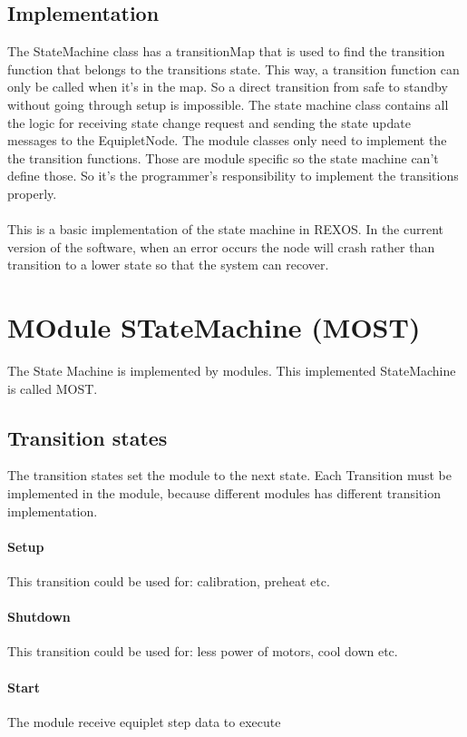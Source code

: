 \documentclass[12pt,a4paper]{report}
\begin{document}
\subsection{Implementation}
The StateMachine class has a transitionMap that is used to find the transition function that belongs to the transitions state. This way, a transition function can only be called when it’s in the map. So a direct transition from safe to standby without going through setup is impossible. The state machine class contains all the logic for receiving state change request and sending the state update messages to the EquipletNode. The module classes only need to implement the the transition functions. Those are module specific so the state machine can’t define those. So it’s the programmer’s responsibility to implement the transitions properly.
\\\\
This is a basic implementation of the state machine in REXOS. In the current version of the software, when an error occurs the node will crash rather than transition to a lower state so that the system can recover.\cite{mast_technical_design}

\newpage
\section{MOdule STateMachine (MOST)}
The State Machine is implemented by modules. This implemented StateMachine is called MOST.

\subsection{Transition states}
The transition states set the module to the next state. Each Transition must be implemented in the module, because different modules has different transition implementation.

\paragraph{Setup}This transition could be used for: calibration, preheat etc.
\paragraph{Shutdown}This transition could be used for: less power of motors, cool down etc.
\paragraph{Start}The module receive equiplet step data to execute
\end{document}
